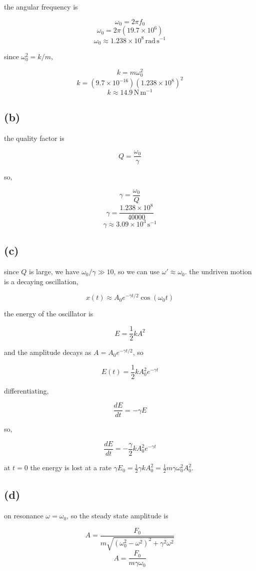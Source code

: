 \documentclass{article}
\begin{document}
the angular frequency is

\[
\omega_0=2\pi f_0
\]
\[
\omega_0=2\pi(19.7\times10^{6})
\]
\[
\omega_0\approx1.238\times10^{8}\,\mathrm{rad\,s^{-1}}
\]

since $\omega_0^2=k/m$,

\[
k=m\omega_0^2
\]
\[
k=(9.7\times10^{-16})(1.238\times10^{8})^2
\]
\[
\boxed{k\approx14.9\,\mathrm{N\,m^{-1}}}
\]

\subsection*{(b)}

the quality factor is

\[
Q=\frac{\omega_0}{\gamma}
\]

so,

\[
\gamma=\frac{\omega_0}{Q}
\]
\[
\gamma=\frac{1.238\times10^{8}}{40000}
\]
\[
\boxed{\gamma\approx3.09\times10^{3}\,\mathrm{s^{-1}}}
\]

\subsection*{(c)}

since $Q$ is large, we have $\omega_0/\gamma\gg10$, so we can use $\omega'\approx\omega_0$. the undriven motion is a decaying oscillation,

\[
x(t)\approx A_0e^{-\gamma t/2}\cos(\omega_0t)
\]

the energy of the oscillator is

\[
E=\frac{1}{2}kA^2
\]

and the amplitude decays as $A=A_0e^{-\gamma t/2}$, so

\[
E(t)=\frac{1}{2}kA_0^2e^{-\gamma t}
\]

differentiating,

\[
\frac{dE}{dt}=-\gamma E
\]

so,

\[
\boxed{\frac{dE}{dt}=-\frac{\gamma}{2}kA_0^2e^{-\gamma t}}
\]

at $t=0$ the energy is lost at a rate $\gamma E_0=\frac{1}{2}\gamma kA_0^2=\frac{1}{2}m\gamma\omega_0^2A_0^2$.

\subsection*{(d)}

on resonance $\omega=\omega_0$, so the steady state amplitude is

\[
A=\frac{F_0}{m\sqrt{(\omega_0^2-\omega^2)^2+\gamma^2\omega^2}}
\]
\[
A=\frac{F_0}{m\gamma\omega_0}
\]
\end{document}
